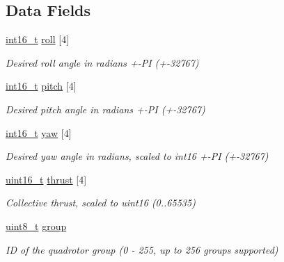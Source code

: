 \subsection*{Data Fields}
\begin{DoxyCompactItemize}
\item 
\hyperlink{stdint_8h_aa343fa3b3d06292b959ffdd4c4703b06}{int16\-\_\-t} \hyperlink{struct____mavlink__set__quad__swarm__led__roll__pitch__yaw__thrust__t_a7e6673c156d61785d094f6642a088152}{roll} \mbox{[}4\mbox{]}
\begin{DoxyCompactList}\small\item\em Desired roll angle in radians +-\/\-P\-I (+-\/32767) \end{DoxyCompactList}\item 
\hyperlink{stdint_8h_aa343fa3b3d06292b959ffdd4c4703b06}{int16\-\_\-t} \hyperlink{struct____mavlink__set__quad__swarm__led__roll__pitch__yaw__thrust__t_ab83ea414a1102e542d30db140ce41aa6}{pitch} \mbox{[}4\mbox{]}
\begin{DoxyCompactList}\small\item\em Desired pitch angle in radians +-\/\-P\-I (+-\/32767) \end{DoxyCompactList}\item 
\hyperlink{stdint_8h_aa343fa3b3d06292b959ffdd4c4703b06}{int16\-\_\-t} \hyperlink{struct____mavlink__set__quad__swarm__led__roll__pitch__yaw__thrust__t_a5107c51df97340cfa9efa6f923b79193}{yaw} \mbox{[}4\mbox{]}
\begin{DoxyCompactList}\small\item\em Desired yaw angle in radians, scaled to int16 +-\/\-P\-I (+-\/32767) \end{DoxyCompactList}\item 
\hyperlink{stdint_8h_a273cf69d639a59973b6019625df33e30}{uint16\-\_\-t} \hyperlink{struct____mavlink__set__quad__swarm__led__roll__pitch__yaw__thrust__t_ab4a629433cf1e7a83f7e6ace99a738c7}{thrust} \mbox{[}4\mbox{]}
\begin{DoxyCompactList}\small\item\em Collective thrust, scaled to uint16 (0..65535) \end{DoxyCompactList}\item 
\hyperlink{stdint_8h_aba7bc1797add20fe3efdf37ced1182c5}{uint8\-\_\-t} \hyperlink{struct____mavlink__set__quad__swarm__led__roll__pitch__yaw__thrust__t_a387adc60138320063388f25ee4272c61}{group}
\begin{DoxyCompactList}\small\item\em I\-D of the quadrotor group (0 -\/ 255, up to 256 groups supported) \end{DoxyCompactList}\item 

\end{DoxyCompactItemize}
